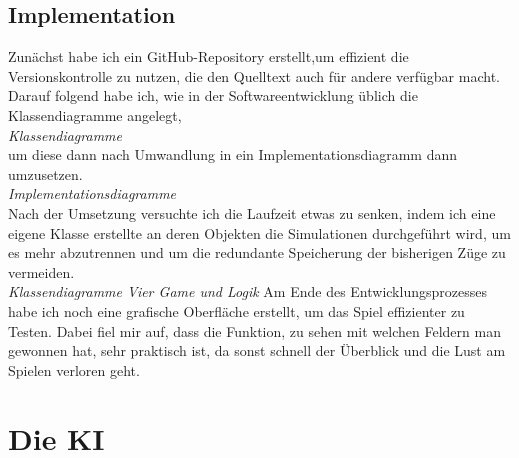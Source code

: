 \documentclass[12pt,a4paper,ngerman]{article}
\begin{document}
	\subsection{Implementation}
	Zunächst habe ich ein GitHub-Repository erstellt,um effizient die Versionskontrolle zu nutzen, die den Quelltext auch für andere verfügbar macht.
	Darauf folgend habe ich, wie in der Softwareentwicklung üblich die Klassendiagramme angelegt,\\
	\textit{Klassendiagramme}\\
	 um diese dann nach Umwandlung in ein Implementationsdiagramm dann umzusetzen.\\
	\textit{Implementationsdiagramme}\\
	Nach der Umsetzung versuchte ich die Laufzeit etwas zu senken, indem ich eine eigene Klasse erstellte an deren Objekten die Simulationen durchgeführt wird, um es mehr abzutrennen und um die redundante Speicherung der bisherigen Züge zu vermeiden.\\
	\textit{Klassendiagramme Vier Game und Logik}
	Am Ende des Entwicklungsprozesses habe ich noch eine grafische Oberfläche erstellt, um das Spiel effizienter zu Testen. Dabei fiel mir auf, dass die Funktion, zu sehen mit welchen Feldern man gewonnen hat, sehr praktisch ist, da sonst schnell der Überblick und die Lust am Spielen verloren geht.
	\section{Die KI}
\end{document}
